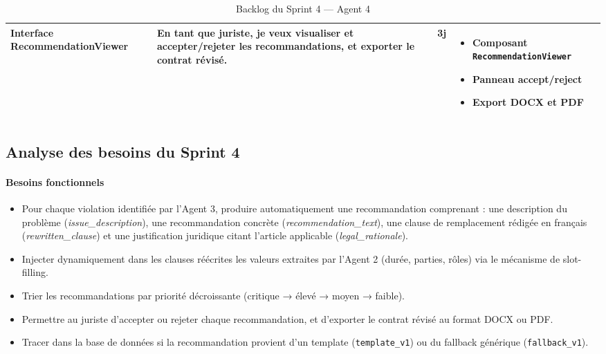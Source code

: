 \begin{table}[!htbp]
{\begin{tabular}{|p{3cm}|p{5.5cm}|p{1.2cm}|p{5.5cm}|}
Interface RecommendationViewer &
En tant que juriste, je veux visualiser et accepter/rejeter les recommandations, et exporter le contrat révisé. &
3j &
\begin{itemize}[leftmargin=*]
\item Composant \texttt{RecommendationViewer}
\item Panneau accept/reject
\item Export DOCX et PDF
\end{itemize} \\
\hline

\end{tabular}%
}
\caption{Backlog du Sprint 4 — Agent 4}
\label{tab:sprint4_agent4}
\end{table}

\subsection{Analyse des besoins du Sprint 4}

\paragraph{Besoins fonctionnels}
\begin{itemize}
    \item Pour chaque violation identifiée par l'Agent 3, produire automatiquement une recommandation comprenant : une description du problème (\textit{issue\_description}), une recommandation concrète (\textit{recommendation\_text}), une clause de remplacement rédigée en français (\textit{rewritten\_clause}) et une justification juridique citant l'article applicable (\textit{legal\_rationale}).
    \item Injecter dynamiquement dans les clauses réécrites les valeurs extraites par l'Agent 2 (durée, parties, rôles) via le mécanisme de slot-filling.
    \item Trier les recommandations par priorité décroissante (critique → élevé → moyen → faible).
    \item Permettre au juriste d'accepter ou rejeter chaque recommandation, et d'exporter le contrat révisé au format DOCX ou PDF.
    \item Tracer dans la base de données si la recommandation provient d'un template (\texttt{template\_v1}) ou du fallback générique (\texttt{fallback\_v1}).
\end{itemize}

